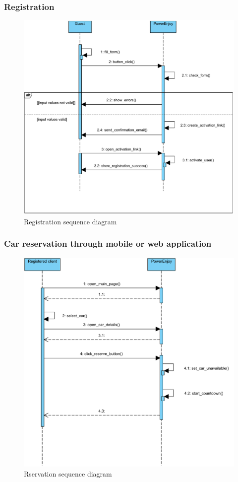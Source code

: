 \subsubsection{Registration}
\begin{figure}[H]
\centering
\includegraphics[width=\textwidth, keepaspectratio]{../images/diagram/sequence/registration.pdf}
\caption{Registration sequence diagram}
\end{figure}


\subsubsection{Car reservation through mobile or web application}
\begin{figure}[H]
\centering
\includegraphics[width=\textwidth, keepaspectratio]{../images/diagram/sequence/reservation.pdf}
\caption{Rservation sequence diagram}
\end{figure}


